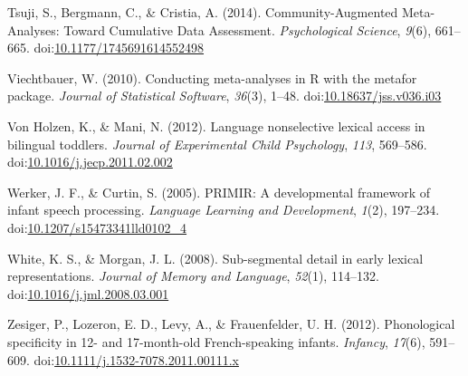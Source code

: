 \documentclass[man]{apa6}
\begin{document}
\leavevmode\hypertarget{ref-Tsuji2014}{}%
Tsuji, S., Bergmann, C., \& Cristia, A. (2014). Community-Augmented Meta-Analyses: Toward Cumulative Data Assessment. \emph{Psychological Science}, \emph{9}(6), 661--665. doi:\href{https://doi.org/10.1177/1745691614552498}{10.1177/1745691614552498}

\leavevmode\hypertarget{ref-metafor}{}%
Viechtbauer, W. (2010). Conducting meta-analyses in R with the metafor package. \emph{Journal of Statistical Software}, \emph{36}(3), 1--48. doi:\href{https://doi.org/10.18637/jss.v036.i03}{10.18637/jss.v036.i03}

\leavevmode\hypertarget{ref-VonHolzen2012}{}%
Von Holzen, K., \& Mani, N. (2012). Language nonselective lexical access in bilingual toddlers. \emph{Journal of Experimental Child Psychology}, \emph{113}, 569--586. doi:\href{https://doi.org/10.1016/j.jecp.2011.02.002}{10.1016/j.jecp.2011.02.002}

\leavevmode\hypertarget{ref-Werker2005}{}%
Werker, J. F., \& Curtin, S. (2005). PRIMIR: A developmental framework of infant speech processing. \emph{Language Learning and Development}, \emph{1}(2), 197--234. doi:\href{https://doi.org/10.1207/s15473341lld0102_4}{10.1207/s15473341lld0102\_4}

\leavevmode\hypertarget{ref-White2008}{}%
White, K. S., \& Morgan, J. L. (2008). Sub-segmental detail in early lexical representations. \emph{Journal of Memory and Language}, \emph{52}(1), 114--132. doi:\href{https://doi.org/10.1016/j.jml.2008.03.001}{10.1016/j.jml.2008.03.001}

\leavevmode\hypertarget{ref-Zesiger2012}{}%
Zesiger, P., Lozeron, E. D., Levy, A., \& Frauenfelder, U. H. (2012). Phonological specificity in 12- and 17-month-old French-speaking infants. \emph{Infancy}, \emph{17}(6), 591--609. doi:\href{https://doi.org/10.1111/j.1532-7078.2011.00111.x}{10.1111/j.1532-7078.2011.00111.x}

\endgroup
\end{document}
